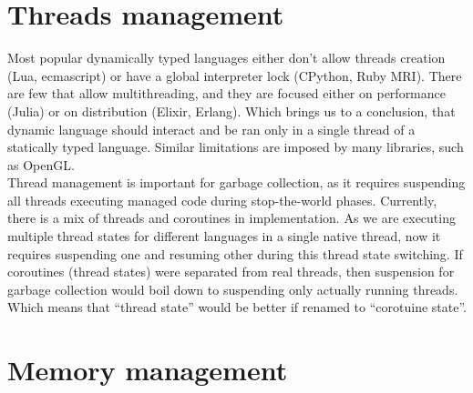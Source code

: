 \documentclass[times, %
               specification,annotation, %
               titlepage-extra-ru,specification-extra-ru,annotation-extra-ru, %
               languages={russian,english} %
              ]{itmo-student-thesis}
\begin{document}
\section{Threads management}
Most popular dynamically typed languages either don't allow threads creation (Lua, ecmascript) or have a global interpreter lock (CPython, Ruby MRI). There are few that allow multithreading, and they are focused either on performance (Julia) or on distribution (Elixir, Erlang). Which brings us to a conclusion, that dynamic language should interact and be ran only in a single thread of a statically typed language. Similar limitations are imposed by many libraries, such as OpenGL.\\
Thread management is important for garbage collection, as it requires suspending all threads executing managed code during stop-the-world phases. Currently, there is a mix of threads and coroutines in implementation. As we are executing multiple thread states for different languages in a single native thread, now it requires suspending one and resuming other during this thread state switching. If coroutines (thread states) were separated from real threads, then suspension for garbage collection would boil down to suspending only actually running threads. Which means that ``thread state'' would be better if renamed to ``corotuine state''.

\section{Memory management}
\end{document}
